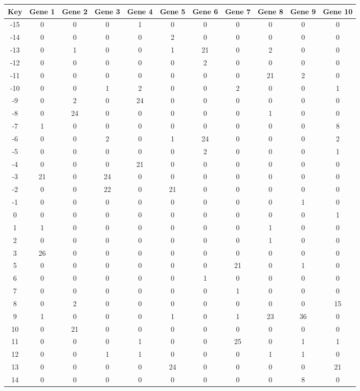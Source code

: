 \begin{tabular}{|c|c|c|c|c|c|c|c|c|c|c|}
\hline
Key & Gene 1 & Gene 2 & Gene 3 & Gene 4 & Gene 5 & Gene 6 & Gene 7 & Gene 8 & Gene 9 & Gene 10 \\
\hline
-15 & 0 & 0 & 0 & 1 & 0 & 0 & 0 & 0 & 0 & 0 \\
-14 & 0 & 0 & 0 & 0 & 2 & 0 & 0 & 0 & 0 & 0 \\
-13 & 0 & 1 & 0 & 0 & 1 & 21 & 0 & 2 & 0 & 0 \\
-12 & 0 & 0 & 0 & 0 & 0 & 2 & 0 & 0 & 0 & 0 \\
-11 & 0 & 0 & 0 & 0 & 0 & 0 & 0 & 21 & 2 & 0 \\
-10 & 0 & 0 & 1 & 2 & 0 & 0 & 2 & 0 & 0 & 1 \\
-9 & 0 & 2 & 0 & 24 & 0 & 0 & 0 & 0 & 0 & 0 \\
-8 & 0 & 24 & 0 & 0 & 0 & 0 & 0 & 1 & 0 & 0 \\
-7 & 1 & 0 & 0 & 0 & 0 & 0 & 0 & 0 & 0 & 8 \\
-6 & 0 & 0 & 2 & 0 & 1 & 24 & 0 & 0 & 0 & 2 \\
-5 & 0 & 0 & 0 & 0 & 0 & 2 & 0 & 0 & 0 & 1 \\
-4 & 0 & 0 & 0 & 21 & 0 & 0 & 0 & 0 & 0 & 0 \\
-3 & 21 & 0 & 24 & 0 & 0 & 0 & 0 & 0 & 0 & 0 \\
-2 & 0 & 0 & 22 & 0 & 21 & 0 & 0 & 0 & 0 & 0 \\
-1 & 0 & 0 & 0 & 0 & 0 & 0 & 0 & 0 & 1 & 0 \\
0 & 0 & 0 & 0 & 0 & 0 & 0 & 0 & 0 & 0 & 1 \\
1 & 1 & 0 & 0 & 0 & 0 & 0 & 0 & 1 & 0 & 0 \\
2 & 0 & 0 & 0 & 0 & 0 & 0 & 0 & 1 & 0 & 0 \\
3 & 26 & 0 & 0 & 0 & 0 & 0 & 0 & 0 & 0 & 0 \\
5 & 0 & 0 & 0 & 0 & 0 & 0 & 21 & 0 & 1 & 0 \\
6 & 0 & 0 & 0 & 0 & 0 & 1 & 0 & 0 & 0 & 0 \\
7 & 0 & 0 & 0 & 0 & 0 & 0 & 1 & 0 & 0 & 0 \\
8 & 0 & 2 & 0 & 0 & 0 & 0 & 0 & 0 & 0 & 15 \\
9 & 1 & 0 & 0 & 0 & 1 & 0 & 1 & 23 & 36 & 0 \\
10 & 0 & 21 & 0 & 0 & 0 & 0 & 0 & 0 & 0 & 0 \\
11 & 0 & 0 & 0 & 1 & 0 & 0 & 25 & 0 & 1 & 1 \\
12 & 0 & 0 & 1 & 1 & 0 & 0 & 0 & 1 & 1 & 0 \\
13 & 0 & 0 & 0 & 0 & 24 & 0 & 0 & 0 & 0 & 21 \\
14 & 0 & 0 & 0 & 0 & 0 & 0 & 0 & 0 & 8 & 0 \\
\hline
\end{tabular}